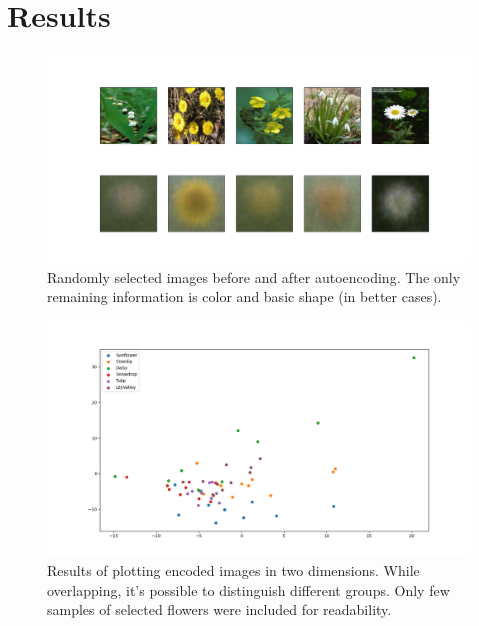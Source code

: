 	\section{Results}
		\begin{figure}[h!]
			\includegraphics[width = \textwidth]{img/Figure_1}
			\caption{Randomly selected images before and after autoencoding. The only remaining information is color and basic shape (in better cases).}
		\end{figure}
		\pagebreak
		\begin{figure}[t!]
			\includegraphics[width = \textwidth]{img/Figure_2}
			\caption{Results of plotting encoded images in two dimensions. While overlapping, it's possible to distinguish different groups. Only few samples of selected flowers were included for readability.}
		\end{figure}  \mbox{}

